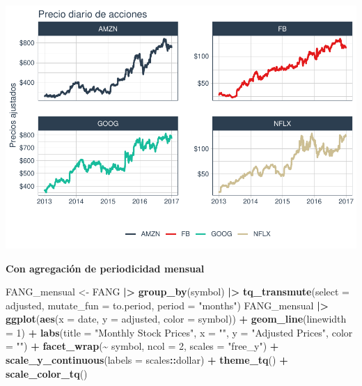 \documentclass[
]{book}
\newenvironment{Shaded}{\begin{snugshade}}{\end{snugshade}}
\newcommand{\AttributeTok}[1]{\textcolor[rgb]{0.13,0.29,0.53}{#1}}
\newcommand{\DecValTok}[1]{\textcolor[rgb]{0.00,0.00,0.81}{#1}}
\newcommand{\FunctionTok}[1]{\textcolor[rgb]{0.13,0.29,0.53}{\textbf{#1}}}
\newcommand{\NormalTok}[1]{#1}
\newcommand{\OtherTok}[1]{\textcolor[rgb]{0.56,0.35,0.01}{#1}}
\newcommand{\SpecialCharTok}[1]{\textcolor[rgb]{0.81,0.36,0.00}{\textbf{#1}}}
\newcommand{\StringTok}[1]{\textcolor[rgb]{0.31,0.60,0.02}{#1}}
\begin{document}
\includegraphics{Libro_TidyQualityTools_files/figure-latex/unnamed-chunk-62-1.pdf}

\textbf{Con agregación de periodicidad mensual}

\begin{Shaded}
\begin{Highlighting}[]
\NormalTok{FANG\_mensual }\OtherTok{\textless{}{-}}\NormalTok{ FANG }\SpecialCharTok{|\textgreater{}}  \FunctionTok{group\_by}\NormalTok{(symbol) }\SpecialCharTok{|\textgreater{}} \FunctionTok{tq\_transmute}\NormalTok{(}\AttributeTok{select =}\NormalTok{ adjusted,}
                                \AttributeTok{mutate\_fun =}\NormalTok{ to.period,}
                                \AttributeTok{period =} \StringTok{"months"}\NormalTok{)}
\NormalTok{FANG\_mensual }\SpecialCharTok{|\textgreater{}} \FunctionTok{ggplot}\NormalTok{(}\FunctionTok{aes}\NormalTok{(}\AttributeTok{x =}\NormalTok{ date, }\AttributeTok{y =}\NormalTok{ adjusted, }\AttributeTok{color =}\NormalTok{ symbol)) }\SpecialCharTok{+}
                \FunctionTok{geom\_line}\NormalTok{(}\AttributeTok{linewidth =} \DecValTok{1}\NormalTok{) }\SpecialCharTok{+} \FunctionTok{labs}\NormalTok{(}\AttributeTok{title =} \StringTok{"Monthly Stock Prices"}\NormalTok{, }\AttributeTok{x =} \StringTok{""}\NormalTok{, }\AttributeTok{y =} \StringTok{"Adjusted Prices"}\NormalTok{, }\AttributeTok{color =} \StringTok{""}\NormalTok{) }\SpecialCharTok{+}
                \FunctionTok{facet\_wrap}\NormalTok{(}\SpecialCharTok{\textasciitilde{}}\NormalTok{ symbol, }\AttributeTok{ncol =} \DecValTok{2}\NormalTok{, }\AttributeTok{scales =} \StringTok{"free\_y"}\NormalTok{) }\SpecialCharTok{+} \FunctionTok{scale\_y\_continuous}\NormalTok{(}\AttributeTok{labels =}\NormalTok{ scales}\SpecialCharTok{::}\NormalTok{dollar) }\SpecialCharTok{+}
                \FunctionTok{theme\_tq}\NormalTok{() }\SpecialCharTok{+} \FunctionTok{scale\_color\_tq}\NormalTok{()}
\end{Highlighting}
\end{Shaded}
\end{document}
